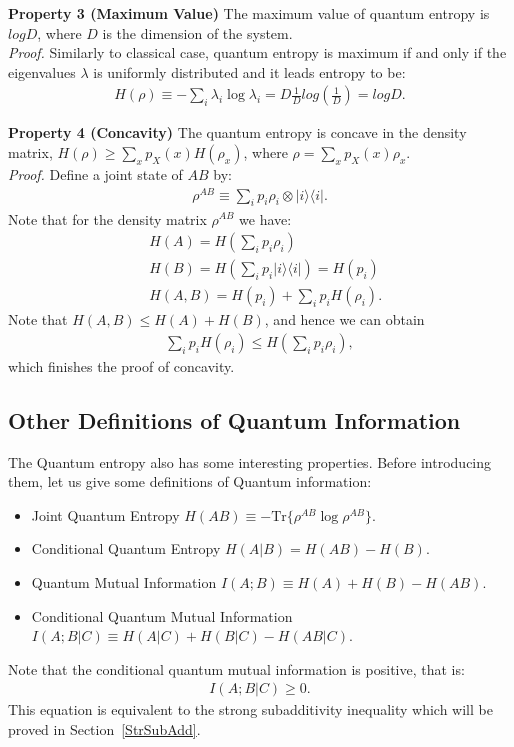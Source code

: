\textbf{Property 3 (Maximum Value)}
The maximum value of quantum entropy is $logD$, where $D$ is the dimension of the system. \\
\textit{Proof.} Similarly to classical case, quantum entropy is maximum if and only if the eigenvalues $\lambda$ is uniformly distributed and it leads entropy to be:
\begin{align}
H(\rho) \equiv -\sum_{i} \lambda_i \log \lambda_i = D\frac{1}{D} log(\frac{1}{D})=logD.
\end{align}

\textbf{Property 4 (Concavity)}
The quantum entropy is concave in the density matrix, $H(\rho) \geq \sum_x p_X(x) H(\rho_x)$, where $\rho = \sum_x p_X(x)\rho_x$. \\
\textit{Proof.} Define a joint state of $AB$ by:
\begin{align}
\rho^{AB} \equiv \sum_i p_i \rho_i \otimes |i\rangle \langle i|.
\end{align}
Note that for the density matrix $\rho^{AB}$ we have:
\begin{align}
&H(A)=H(\sum_i p_i \rho_i) \nonumber \\
&H(B)=H(\sum_i p_i |i \rangle \langle i|)=H(p_i) \nonumber \\
&H(A,B)=H(p_i)+\sum_i p_i H(\rho_i).
\end{align}
Note that $H(A,B) \leq H(A)+H(B)$, and hence we can obtain
\begin{align}
\sum_i p_i H(\rho_i) \leq H(\sum_i p_i \rho_i),
\end{align}
which finishes the proof of concavity.

\subsection{Other Definitions of Quantum Information}
The Quantum entropy also has some interesting properties.
Before introducing them, let us give some definitions of Quantum information: \\
\begin{itemize}
	\item {Joint Quantum Entropy} $H(AB) \equiv -\text{Tr}\{\rho^{AB} \log \rho^{AB}\}$.
	\item {Conditional Quantum Entropy} $H(A|B) = H(AB) - H(B)$.
	\item {Quantum Mutual Information} $I(A;B) \equiv H(A)+H(B)-H(AB)$.
	\item {Conditional Quantum Mutual Information} $I(A;B|C) \equiv H(A|C)+H(B|C)-H(AB|C)$.
\end{itemize}
Note that the conditional quantum mutual information is positive, that is:
\begin{align}
I(A;B|C) \geq 0.
\end{align}
This equation is equivalent to the strong subadditivity inequality which will be proved in Section~\ref{StrSubAdd}.

